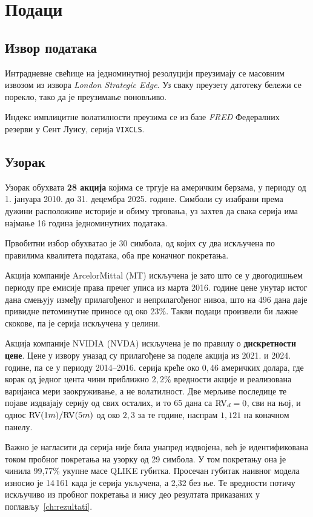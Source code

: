 \section{Подаци}

\subsection{Извор података}

Интрадневне свећице на једноминутној резолуцији преузимају се масовним извозом из
извора \textit{London Strategic Edge}. Уз сваку преузету датотеку бележи се порекло,
тако да је преузимање поновљиво.

Индекс имплицитне волатилности преузима се из базе \textit{FRED} Федералних резерви
у Сент Луису, серија \texttt{VIXCLS}.

\subsection{Узорак}
\label{subsec:uzorak}

Узорак обухвата \textbf{28 акција} којима се тргује на америчким берзама,
у периоду од 1. јануара 2010. до 31. децембра 2025. године. Симболи су изабрани према
дужини расположиве историје и обиму трговања, уз захтев да свака серија има најмање
16 година једноминутних података.

Првобитни избор обухватао је 30 симбола, од којих су два искључена по правилима
квалитета података, оба пре коначног покретања.

Акција компаније ArcelorMittal (MT) искључена је зато што се у двогодишњем периоду пре
емисије права пречег уписа из марта 2016. године цене унутар истог дана смењују између
прилагођеног и неприлагођеног нивоа, што на 496 дана даје привидне петоминутне приносе
од око 23\%. Такви подаци произвели би лажне скокове, па је серија искључена у целини.

Акција компаније NVIDIA (NVDA) искључена је по правилу о \textbf{дискретности цене}.
Цене у извору уназад су прилагођене за поделе акција из 2021. и 2024. године, па се у
периоду 2014–2016. серија креће око $0{,}46$ америчких долара, где корак од једног цента
чини приближно $2{,}2\%$ вредности акције и реализована варијанса мери заокруживање, а
не волатилност. Две мерљиве последице те појаве издвајају серију од свих осталих, и то
65 дана са $\mathrm{RV}_d = 0$, сви на њој, и однос $\mathrm{RV}(1m)/\mathrm{RV}(5m)$ од око $2{,}3$ за те
године, наспрам $1{,}121$ на коначном панелу.

Важно је нагласити да серија није била унапред издвојена, већ је идентификована током
пробног покретања на узорку од 29 симбола. У том покретању она је чинила
99,77\% укупне масе QLIKE губитка. Просечан губитак наивног модела износио је 14\,161
када је серија укључена, а 2,32 без ње. Те вредности потичу искључиво из пробног
покретања и нису део резултата приказаних у поглављу~\ref{ch:rezultati}.

